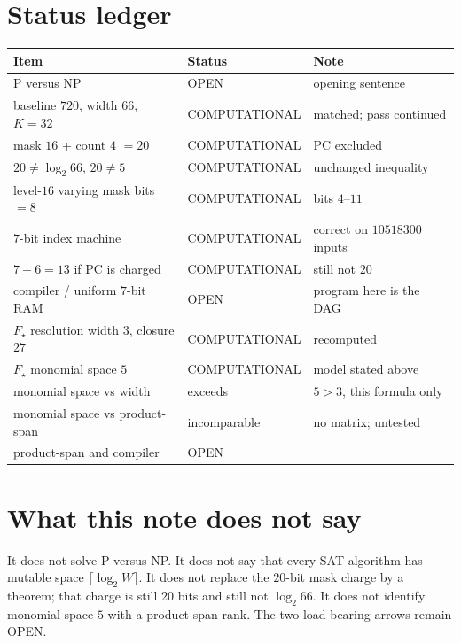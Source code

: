 \documentclass[11pt]{article}
\begin{document}
\section*{Status ledger}
\begin{center}
\begin{tabular}{@{}llp{2.6in}@{}}
\toprule
Item & Status & Note \\
\midrule
P versus NP & OPEN & opening sentence \\
baseline \(720\), width \(66\), \(K=32\) & COMPUTATIONAL & matched; pass continued \\
mask \(16\) + count \(4\) \(=20\) & COMPUTATIONAL & PC excluded \\
\(20\neq\log_2 66\), \(20\neq 5\) & COMPUTATIONAL & unchanged inequality \\
level-\(16\) varying mask bits \(=8\) & COMPUTATIONAL & bits \(4\)--\(11\) \\
\(7\)-bit index machine & COMPUTATIONAL & correct on \(10518300\) inputs \\
\(7+6=13\) if PC is charged & COMPUTATIONAL & still not \(20\) \\
compiler / uniform \(7\)-bit RAM & OPEN & program here is the DAG \\
\(F_\star\) resolution width \(3\), closure \(27\) & COMPUTATIONAL & recomputed \\
\(F_\star\) monomial space \(5\) & COMPUTATIONAL & model stated above \\
monomial space vs width & exceeds & \(5>3\), this formula only \\
monomial space vs product-span & incomparable & no matrix; untested \\
product-span and compiler & OPEN & \\
\bottomrule
\end{tabular}
\end{center}

\section*{What this note does not say}
It does not solve P versus NP.
It does not say that every SAT algorithm has mutable space \(\lceil\log_2 W\rceil\).
It does not replace the \(20\)-bit mask charge by a theorem; that charge is still \(20\) bits and still not \(\log_2 66\).
It does not identify monomial space \(5\) with a product-span rank.
The two load-bearing arrows remain OPEN.
\end{document}
